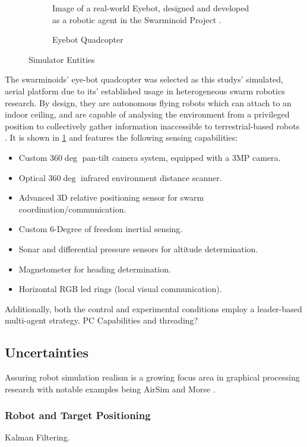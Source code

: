 \documentclass{report}
\begin{document}
\begin{figure}
\begin{subfigure}[b]{0.4\textwidth}
		\caption{Eyebot Quadcopter}
		\label{fig:eyebot_hardware}
		{Image of a real-world Eyebot, designed and developed as a robotic agent in the Swarminoid Project \cite{Dorigo2013}}.
	\end{subfigure}
	\caption{Simulator Entities}
	\label{fig:sim_orig}
\end{figure}

The swarminoids' \cite{Dorigo2013} eye-bot quadcopter was selected as this studys' simulated, aerial platform due to its' established usage in heterogeneous swarm robotics research. By design, they are autonomous flying robots which can attach to an indoor ceiling, and are capable of analysing the environment from a privileged position to collectively gather information inaccessible to terrestrial-based robots \cite{Dorigo2013}. It is shown in \ref{fig:eyebot_hardware} and features the following sensing capabilities:
\begin{itemize}
    \item Custom $360\deg$ pan-tilt camera system, equipped with a 3MP camera.
    \item Optical $360\deg$ infrared environment distance scanner.
    \item Advanced 3D relative positioning sensor for swarm coordination/communication.
    \item Custom 6-Degree of freedom inertial sensing.
    \item Sonar and differential pressure sensors for altitude determination.
    \item Magnetometer for heading determination.
    \item Horizontal RGB led rings (local visual communication).
\end{itemize}

Additionally, both the control and experimental conditions employ a leader-based multi-agent strategy. PC Capabilities and threading?

\subsection{Uncertainties}
Assuring robot simulation realism is a growing focus area in graphical processing research with notable examples being AirSim \cite{Shah} and Morse \cite{Morse2011}.

\subsubsection{Robot and Target Positioning}
Kalman Filtering.
\end{document}
